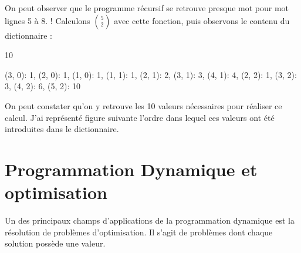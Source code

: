 \documentclass[letterpaper,10pt,english]{jupyterBook}
\begin{document}
\sphinxAtStartPar
On peut observer
que le programme récursif se retrouve presque mot pour mot lignes 5 à 8. !
Calculons \(\binom{5}{2}\) avec cette fonction, puis observons le contenu du dictionnaire :
\begin{sphinxVerbatimInput}

\begin{sphinxVerbatim}[commandchars=\\\{\}]
 
\end{sphinxVerbatim}
\end{sphinxVerbatimInput}
\begin{sphinxVerbatimOutput}

\begin{sphinxVerbatim}[commandchars=\\\{\}]
10
\end{sphinxVerbatim}
\end{sphinxVerbatimOutput}
\begin{sphinxVerbatimInput}

\begin{sphinxVerbatim}[commandchars=\\\{\}]
\end{sphinxVerbatim}
\end{sphinxVerbatimInput}
\begin{sphinxVerbatimOutput}

\begin{sphinxVerbatim}[commandchars=\\\{\}]
\PYGZob{}(3, 0): 1, (2, 0): 1, (1, 0): 1, (1, 1): 1, (2, 1): 2, (3, 1): 3, (4, 1): 4, (2, 2): 1, (3, 2): 3, (4, 2): 6, (5, 2): 10\PYGZcb{}
\end{sphinxVerbatim}
\end{sphinxVerbatimOutput}

\sphinxAtStartPar
On peut constater qu’on y retrouve les 10 valeurs nécessaires pour réaliser ce calcul. J’ai représenté figure suivante  l’ordre dans lequel ces valeurs ont été introduites dans le dictionnaire.




\chapter{Programmation Dynamique et optimisation}
\label{\detokenize{notebooks/dynamicProgramming/ProgrammationDynamique:programmation-dynamique-et-optimisation}}
\sphinxAtStartPar
Un des principaux champs d’applications de la programmation dynamique est la résolution de problèmes d’optimisation. Il s’agit de problèmes dont chaque solution possède une valeur.
\end{document}
